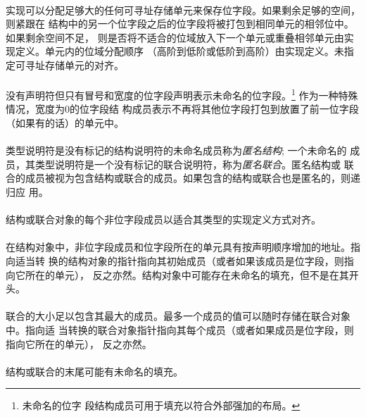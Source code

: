 \paragraph{}
实现可以分配足够大的任何可寻址存储单元来保存位字段。如果剩余足够的空间，则紧跟在
结构中的另一个位字段之后的位字段将被打包到相同单元的相邻位中。如果剩余空间不足，
则是否将不适合的位域放入下一个单元或重叠相邻单元由实现定义。单元内的位域分配顺序
（高阶到低阶或低阶到高阶）由实现定义。未指定可寻址存储单元的对齐。

\paragraph{}
没有声明符但只有冒号和宽度的位字段声明表示未命名的位字段。\footnote{未命名的位字
段结构成员可用于填充以符合外部强加的布局。} 作为一种特殊情况，宽度为0的位字段结
构成员表示不再将其他位字段打包到放置了前一位字段（如果有的话）的单元中。

\paragraph{}
类型说明符是没有标记的结构说明符的未命名成员称为\textit{匿名结构}; 一个未命名的
成员，其类型说明符是一个没有标记的联合说明符，称为\textit{匿名联合}。匿名结构或
联合的成员被视为包含结构或联合的成员。如果包含的结构或联合也是匿名的，则递归应
用。

\paragraph{}
结构或联合对象的每个非位字段成员以适合其类型的实现定义方式对齐。

\paragraph{}
在结构对象中，非位字段成员和位字段所在的单元具有按声明顺序增加的地址。指向适当转
换的结构对象的指针指向其初始成员（或者如果该成员是位字段，则指向它所在的单元），
反之亦然。结构对象中可能存在未命名的填充，但不是在其开头。

\paragraph{}
联合的大小足以包含其最大的成员。最多一个成员的值可以随时存储在联合对象中。指向适
当转换的联合对象指针指向其每个成员（或者如果成员是位字段，则指向它所在的单元），
反之亦然。

\paragraph{}
结构或联合的末尾可能有未命名的填充。

